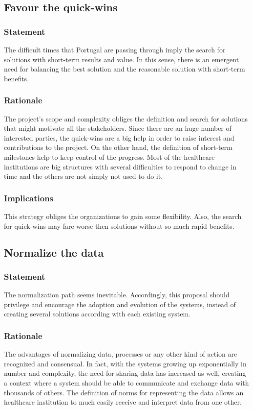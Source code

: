 
\subsection{Favour the quick-wins}

\subsubsection{Statement}
The difficult times that Portugal are passing through imply the search for solutions with short-term results and value. In this sense, there is an emergent need for balancing the best solution and the reasonable solution with short-term benefits.
\subsubsection{Rationale}
The project's scope and complexity obliges the definition and search for solutions that might motivate all the stakeholders. Since there are an huge number of interested parties, the quick-wins are a big help in order to raise interest and contributions to the project. On the other hand, the definition of short-term milestones help to keep control of the progress. Most of the healthcare institutions are big structures with several difficulties to respond to change in time and the others are not simply not used to do it.
\subsubsection{Implications}
This strategy obliges the organizations to gain some flexibility. Also, the search for quick-wins may fare worse then solutions without so much rapid benefits. 


\subsection{Normalize the data}

\subsubsection{Statement}
The normalization path seems inevitable. Accordingly, this proposal should privilege and encourage the adoption and evolution of the systems, instead of creating several solutions according with each existing system.
\subsubsection{Rationale}
The advantages of normalizing data, processes or any other kind of action are recognized and consensual. In fact, with the systems growing up exponentially in number and complexity, the need for sharing data has increased as well, creating a context where a system should be able to communicate and exchange data with thousands of others. The definition of norms for representing the data allows an healthcare institution to much easily receive and interpret data from one other.
